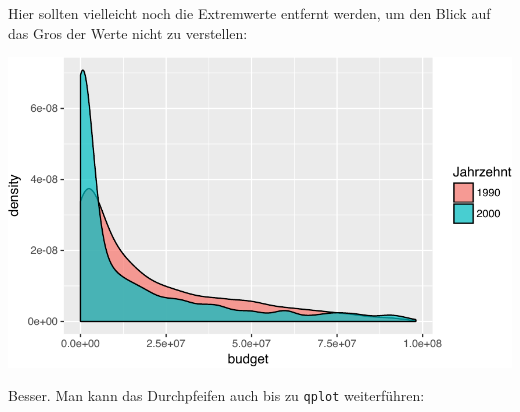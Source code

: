 \documentclass[12pt,]{book}
\newenvironment{Shaded}{\begin{snugshade}}{\end{snugshade}}
\newcommand{\KeywordTok}[1]{\textcolor[rgb]{0.13,0.29,0.53}{\textbf{{#1}}}}
\newcommand{\DataTypeTok}[1]{\textcolor[rgb]{0.13,0.29,0.53}{{#1}}}
\newcommand{\DecValTok}[1]{\textcolor[rgb]{0.00,0.00,0.81}{{#1}}}
\newcommand{\StringTok}[1]{\textcolor[rgb]{0.31,0.60,0.02}{{#1}}}
\newcommand{\NormalTok}[1]{{#1}}
\begin{document}
Hier sollten vielleicht noch die Extremwerte entfernt werden, um den
Blick auf das Gros der Werte nicht zu verstellen:

\begin{Shaded}
\end{Shaded}

\begin{center}\includegraphics[width=0.7\linewidth]{050_Daten_visualisieren_files/figure-latex/unnamed-chunk-13-1} \end{center}

Besser. Man kann das Durchpfeifen auch bis zu \texttt{qplot}
weiterführen:

\begin{Shaded}
\end{Shaded}
\end{document}

